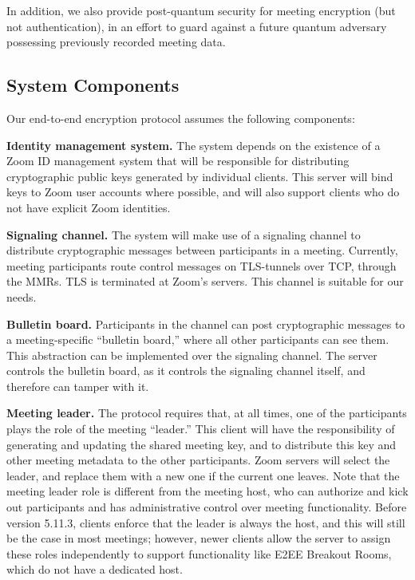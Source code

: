 In addition, we also provide post-quantum security for meeting encryption (but not authentication), in an effort to guard against a future quantum adversary possessing previously recorded meeting data.

\subsection{System Components}
\label{subsec:comp}

Our end-to-end encryption protocol assumes the following components:
\begin{description}
\item {\bf Identity management system.} The system depends on the existence of a Zoom ID management
system that will be responsible for distributing cryptographic public keys generated by individual
clients. This server will bind keys to Zoom user accounts where possible, and will also support
clients who do not have explicit Zoom identities.

\item {\bf Signaling channel.} The system will make use of a signaling channel to distribute
cryptographic messages between participants in a meeting. Currently, meeting participants route
control messages on TLS-tunnels over TCP, through the MMRs. TLS is terminated at Zoom's servers.
This channel is suitable for our needs.

\item {\bf Bulletin board.} Participants in the channel can post cryptographic messages to a
meeting-specific ``bulletin board,'' where all other participants can see them. This abstraction can
be implemented over the signaling channel. The server controls the bulletin board, as it controls
the signaling channel itself, and therefore can tamper with it.

\item {\bf Meeting leader.} The protocol requires that, at all times, one of the participants plays
the role of the meeting ``leader.'' This client will have the responsibility of generating and
updating the shared meeting key, and to distribute this key and other meeting metadata to the other
participants. Zoom servers will select the leader, and replace them with a new one if the current
one leaves. Note that the meeting leader role is different from the meeting host, who can authorize
and kick out participants and has administrative control over meeting functionality. Before version
5.11.3, clients enforce that the leader is always the host, and this will still be the case in most
meetings; however, newer clients allow the server to assign these roles independently to support
functionality like E2EE Breakout Rooms, which do not have a dedicated host.

\end{description}

